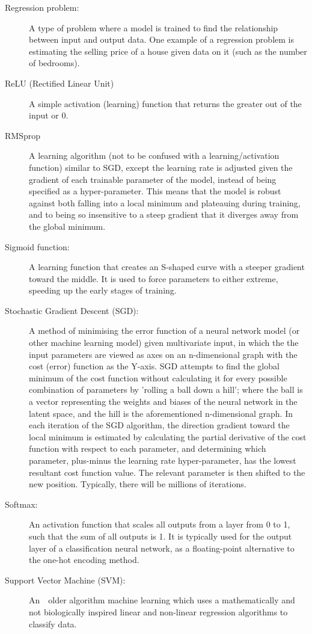 \documentclass[]{report}
\begin{document}
\begin{description}
\item[Regression problem:] A type of problem where a model is trained to find the relationship between input and output data. One example of a regression problem is estimating the selling price of a house given data on it (such as the number of bedrooms).	

\item[ReLU (Rectified Linear Unit)] A simple activation (learning) function that returns the greater out of the input or 0.

\item[RMSprop] A learning algorithm (not to be confused with a learning/activation function) similar to SGD, except the learning rate is adjusted given the gradient of each trainable parameter of the model, instead of being specified as a hyper-parameter. This means that the model is robust against both falling into a local minimum and plateauing during training, and to being so insensitive to a steep gradient that it diverges away from the global minimum.

\item[Sigmoid function:] A learning function that creates an S-shaped curve with a steeper gradient toward the middle. It is used to force parameters to either extreme, speeding up the early stages of training.

\label{itm:SGD}
\item[Stochastic Gradient Descent (SGD):] A method of minimising the error function of a neural network model (or other machine learning model) given multivariate input, in which the the input parameters are viewed as axes on an n-dimensional graph with the cost (error) function as the Y-axis. SGD attempts to find the global minimum of the cost function without calculating it for every possible combination of parameters by 'rolling a ball down a hill'; where the ball is a vector representing the weights and biases of the neural network in the latent space, and the hill is the aforementioned n-dimensional graph. In each iteration of the SGD algorithm, the direction gradient toward the local minimum is estimated by calculating the partial derivative of the cost function with respect to each parameter, and determining which parameter, plus-minus the learning rate hyper-parameter, has the lowest resultant cost function value. The relevant parameter is then shifted to the new position. Typically, there will be millions of iterations.

\item[Softmax:] An activation function that scales all outputs from a layer from 0 to 1, such that the sum of all outputs is 1. It is typically used for the output layer of a classification neural network, as a floating-point alternative to the one-hot encoding method.

\item[Support Vector Machine (SVM):] An　older algorithm machine learning which uses a mathematically and not biologically inspired linear and non-linear regression algorithms to classify data.
\end{description}
\onecolumn

\printbibliography
\end{document}

